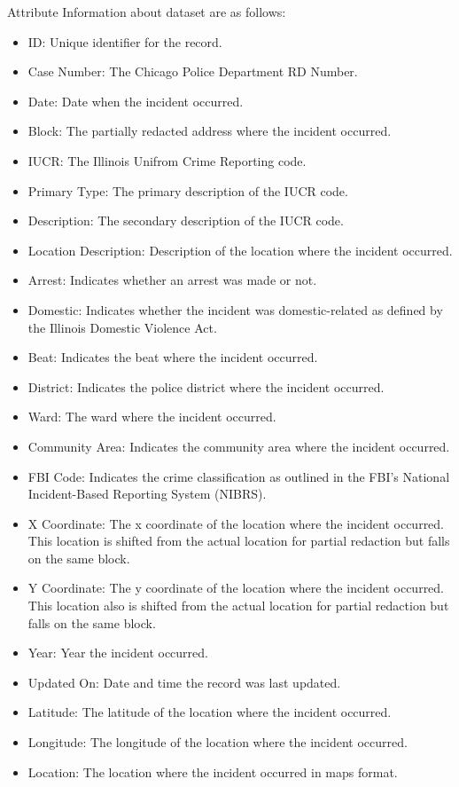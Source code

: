 Attribute Information about dataset are as follows:
\begin{itemize}
	\item ID: Unique identifier for the record.
	\item Case Number: The Chicago Police Department RD Number.
	\item Date: Date when the incident occurred.
	\item Block: The partially redacted address where the incident occurred.
	\item IUCR: The Illinois Unifrom Crime Reporting code. 
	\item Primary Type: The primary description of the IUCR code.
	\item Description: The secondary description of the IUCR code.
	\item Location Description: Description of the location where the incident occurred.
	\item Arrest: Indicates whether an arrest was made or not.
	\item Domestic: Indicates whether the incident was domestic-related as defined by the Illinois Domestic Violence Act.
	\item Beat: Indicates the beat where the incident occurred.
	\item District: Indicates the police district where the incident occurred.
	\item Ward: The ward where the incident occurred.
	\item Community Area: Indicates the community area where the incident occurred.
	\item FBI Code: Indicates the crime classification as outlined in the FBI's National Incident-Based Reporting System (NIBRS).
	\item X Coordinate: The x coordinate of the location where the incident occurred. This location is shifted from the actual location for partial redaction but falls on the same block.
	\item Y Coordinate: The y coordinate of the location where the incident occurred. This location also is shifted from the actual location for partial redaction but falls on the same block.
	\item Year: Year the incident occurred.
	\item Updated On: Date and time the record was last updated.
	\item Latitude: The latitude of the location where the incident occurred.
	\item Longitude: The longitude of the location where the incident occurred. 
	\item Location: The location where the incident occurred in maps format.
\end{itemize}

